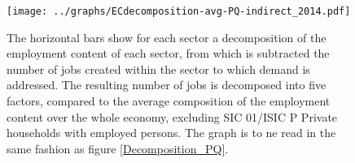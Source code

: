 \documentclass[12pt,english]{article}
\begin{document}
\begin{figure}[!ht]
	\centering
	\texttt{[image: ../graphs/ECdecomposition-avg-PQ-indirect\_2014.pdf]}
	\caption{\footnotesize \label{Decomposition_PQ_other}The horizontal bars show for each sector a decomposition of the employment content of each sector, from which is subtracted the number of jobs created within the sector to which demand is addressed. The resulting number of jobs is decomposed into five factors, compared to the average composition of the employment content over the whole economy, excluding SIC 01/ISIC P Private households with employed persons. The graph is to ne read in the same fashion as figure \ref{Decomposition_PQ}. %
	}
\end{figure}

%
%
\end{document}
